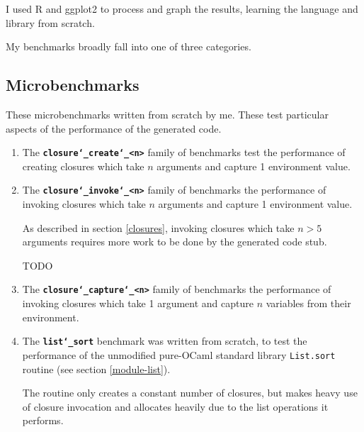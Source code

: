 \documentclass[12pt,a4paper,twoside,openright]{report}
\begin{document}
I used R and ggplot2 to process and graph the results, learning the language and library from scratch.

My benchmarks broadly fall into one of three categories.

\subsection{Microbenchmarks}
These microbenchmarks written from scratch by me. These test particular aspects
of the performance of the generated code.

\begin{enumerate}
  \item
    The \textbf{\texttt{closure\char`_create\char`_<n>}} family of benchmarks test the performance of
    creating closures which take $n$ arguments and capture 1 environment value.

  \item
    The \textbf{\texttt{closure\char`_invoke\char`_<n>}} family of benchmarks the performance of
    invoking closures which take $n$ arguments and capture 1 environment value.

    As described in section \ref{closures}, invoking closures which take $n >
    5$ arguments requires more work to be done by the generated code stub.

    TODO

  \item
    The \textbf{\texttt{closure\char`_capture\char`_<n>}} family of benchmarks the performance
    of invoking closures which take 1 argument and capture $n$ variables from their environment.

  \item

  The \textbf{\texttt{list\char`_sort}} benchmark was written from scratch, to test the
  performance of the unmodified pure-OCaml standard library \lstinline!List.sort!
  routine (see section \ref{module-list}).

  The routine only creates a constant number of closures, but makes heavy use of
  closure invocation and allocates heavily due to the list operations it
  performs.
\end{enumerate}
\end{document}
